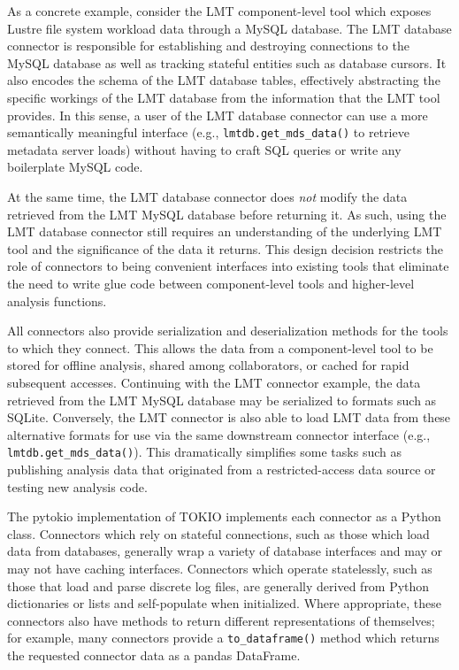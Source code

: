 As a concrete example, consider the LMT component-level tool which exposes Lustre file system workload data through a MySQL database.
The LMT database connector is responsible for establishing and destroying connections to the MySQL database as well as tracking stateful entities such as database cursors.
It also encodes the schema of the LMT database tables, effectively abstracting the specific workings of the LMT database from the information that the LMT tool provides.
In this sense, a user of the LMT database connector can use a more semantically meaningful interface (e.g., \texttt{lmtdb.get\_mds\_data()} to retrieve metadata server loads) without having to craft SQL queries or write any boilerplate MySQL code.

At the same time, the LMT database connector does \emph{not} modify the data retrieved from the LMT MySQL database before returning it.
As such, using the LMT database connector still requires an understanding of the underlying LMT tool and the significance of the data it returns.
This design decision restricts the role of connectors to being convenient interfaces into existing tools that eliminate the need to write glue code between component-level tools and higher-level analysis functions.

All connectors also provide serialization and deserialization methods for the tools to which they connect.
This allows the data from a component-level tool to be stored for offline analysis, shared among collaborators, or cached for rapid subsequent accesses.
Continuing with the LMT connector example, the data retrieved from the LMT MySQL database may be serialized to formats such as SQLite.
Conversely, the LMT connector is also able to load LMT data from these alternative formats for use via the same downstream connector interface (e.g., \texttt{lmtdb.get\_mds\_data()}).
This dramatically simplifies some tasks such as publishing analysis data that originated from a restricted-access data source or testing new analysis code.

The pytokio implementation of TOKIO implements each connector as a Python class.
Connectors which rely on stateful connections, such as those which load data from databases, generally wrap a variety of database interfaces and may or may not have caching interfaces.
Connectors which operate statelessly, such as those that load and parse discrete log files, are generally derived from Python dictionaries or lists and self-populate when initialized.
Where appropriate, these connectors also have methods to return different representations of themselves; for example, many connectors provide a \texttt{to\_dataframe()} method which returns the requested connector data as a pandas DataFrame.


